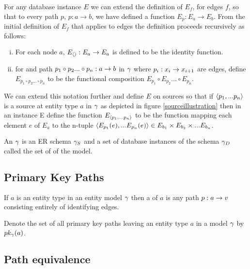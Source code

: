 \noindent For any database instance $E$ we can  extend  the definition of
$E_f$, for edges $f$,  so that to every path $p$, $p: a \rightarrow b$,  we have defined a function $E_p: E_a \rightarrow E_b$. From the initial definition of $E_f$ that applies to 
edges the definition proceeds recursively as follows: 
\begin{enumerate} [(i)]
\item{
For each node $a$, $E_{\langle\rangle}: E_a \rightarrow E_a$ is defined to be the identity function.
}
\item for and path $p_1 \circ p_2... \circ p_n: a \rightarrow b$ in $\gamma$ where $p_i: x_i \rightarrow x_{i+1}$ are edges,
define $E_{p_1 \circ p_2... \circ p_n}$ to be the functional composition $E_{p_1} \circ E_{p_2}... \circ E_{p_n}$.
\end{enumerate}

We can extend this notation further and define $E$ on sources so that if 
$\langle p_1,...p_n\rangle$ is a source at entity type $a$ in $\gamma$ as depicted in figure \ref{sourceillustration} then in an instance E
define the function  $E_{\langle p_1,...p_n\rangle}$  to be the function mapping each element $e$ 
of $E_a$ to the n-tuple
$\langle E_{p_1}(e),...E_{p_n}(e)\rangle \in E_{b_1} \times E_{b_2} \times ... E_{b_n}$.

\begin{definition}
\noindent An  $\gamma$ is an ER schema $\gamma_S$ and a set of database instances of the schema $\gamma_D$ called the set of
 of the model. \\
\end{definition}

\subsection{Primary Key Paths}
\begin{definition}
If $a$ is an entity type in an entity model $\gamma$ then a 
of $a$ is any path $p:a \rightarrow v$ consisting entirely of identifying edges. 
\end{definition}

Denote the set of all primary key paths leaving an entity type $a$ in a model $\gamma$ by 
$pk_{\gamma}(a)$.

\subsection{Path equivalence}

